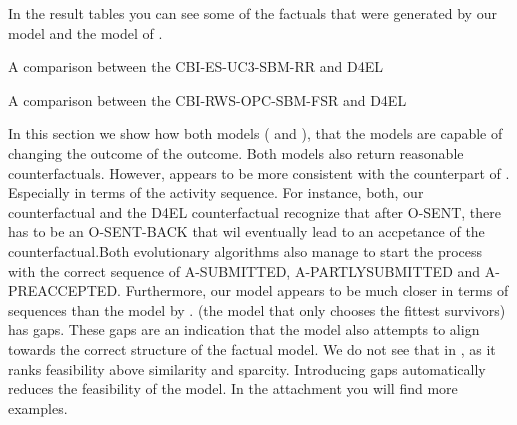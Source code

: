 \documentclass[./../../paper.tex]{subfiles}
\begin{document}
In the result tables you can see some of the factuals that were generated by our model and the model of \autocite{hsieh_DiCE4ELInterpretingProcess_2021}.  

\begin{table}
    \centering    
    \resizebox{\linewidth}{!}{
    
    }
    \caption{A comparison between the CBI-ES-UC3-SBM-RR and D4EL}
    \label{fig:exp7-RR}
\end{table}
\begin{table}
    \centering    
    \resizebox{\linewidth}{!}{
    
    
    }
\caption{A comparison between the CBI-RWS-OPC-SBM-FSR and D4EL}
\label{fig:exp7-FSR}
\end{table}

% 

% 

% 

In this section we show how both models ( and ), that the models are capable of changing the outcome of the outcome. Both models also return reasonable counterfactuals. However,  appears to be more consistent with the counterpart of \autocite{hsieh_DiCE4ELInterpretingProcess_2021}. Especially in terms of the activity sequence. For instance, both, our counterfactual and the D4EL counterfactual recognize that after O-SENT, there has to be an O-SENT-BACK that wil eventually lead to an accpetance of the counterfactual.Both evolutionary algorithms also manage to start the process with the correct sequence of A-SUBMITTED, A-PARTLYSUBMITTED and A-PREACCEPTED. Furthermore, our model appears to be much closer in terms of sequences than the model by \citeauthor{hsieh_DiCE4ELInterpretingProcess_2021}.  (the model that only chooses the fittest survivors) has gaps. These gaps are an indication that the model also attempts to align towards the correct structure of the factual model. We do not see that in , as it ranks feasibility above similarity and sparcity. Introducing gaps automatically reduces the feasibility of the model. In the attachment you will find more examples.

\end{document}
